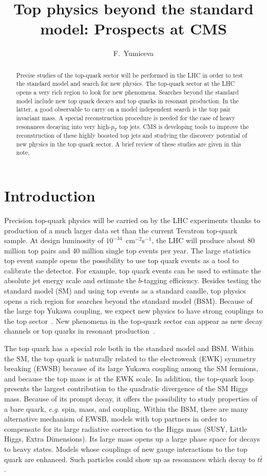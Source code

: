 \documentclass{cimento}
\title{Top physics beyond the standard model: Prospects at CMS}
\author{F.~Yumiceva\from{ins:x}}
\begin{document}
\maketitle

\begin{abstract}
Precise studies of the top-quark sector will be performed in the LHC
in order to test the standard model and search for new physics.
The top-quark sector at the LHC opens a very rich region to look for new 
phenomena. Searches beyond the standard model include new top quark 
decays 
and top quarks in resonant production. In the latter, a good observable to carry on a 
model independent 
search is the top pair invariant mass. A special reconstruction
procedure is needed for the case of heavy resonances decaying into very
high-$p_{T}$ top jets. 
CMS is developing tools to improve 
the reconstruction of these highly boosted top jets and studying the discovery potential of new physics in the top quark sector. A brief review of these studies
are given in this note.
\end{abstract}

\section{Introduction}
\label{sec:Intro}

Precision top-quark physics will be carried on by the LHC experiments
thanks to production of a much larger data set than the current Tevatron top-quark sample.
At design luminosity of $10^{-34}$~cm$^{-2}$s$^{-1}$, the LHC will
produce about 80 million top pairs and 40 million single top events per
year. The large statistics top event sample opens the possibility to use top quark
events as a tool to calibrate the detector. For example, top quark events
can be used to estimate the absolute jet energy scale and estimate
the $b$-tagging efficiency. Besides testing the standard model (SM) and using top
events as a standard candle, top physics opens a rich region for searches
beyond the standard model (BSM). Because of the large top Yukawa coupling,
we expect new physics to have strong couplings to the top sector~\cite{ref:Wang}.
New phenomena in the top-quark sector can appear as new
decay channels or top quarks in resonant production~\cite{ref:Han}.

The top quark has a special role both in the standard model and BSM. Within
the SM, the top quark is naturally related to the electroweak (EWK)
symmetry breaking (EWSB) because of its large Yukawa coupling among the SM fermions,
and because the top mass is at the EWK scale. In addition, the top-quark loop
presents the largest contribution to the quadratic divergence of
the SM Higgs mass. Because of its prompt decay, it offers the possibility to study 
properties of a bare quark, {\it e.g.} spin, mass, and coupling. Within the
BSM, there are many alternative mechanism of EWSB, models with top partners
in order to compensate for its large radiative correction to the Higgs 
mass (SUSY, Little Higgs, Extra Dimensions). Its large mass opens up
a large phase space for decays to heavy states. Models whose couplings
of new gauge interactions to the top quark are enhanced. Such particles 
could show up as resonances which decay to $t\bar{t}$. 
\end{document}
